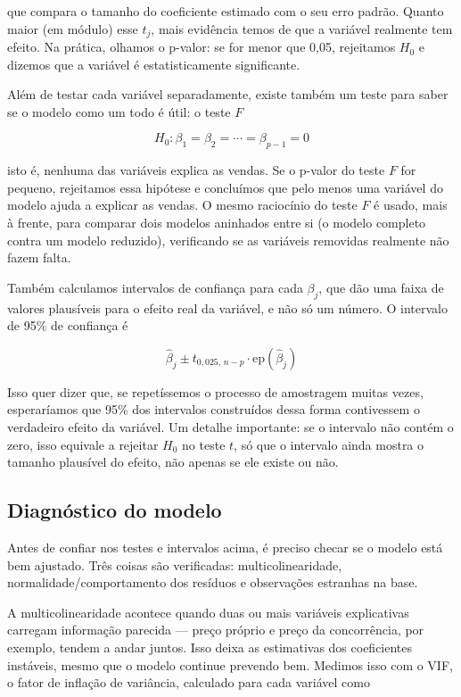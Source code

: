 \documentclass[a4paper]{modeloUFCG} %
\begin{document}
que compara o tamanho do coeficiente estimado com o seu erro padrão. Quanto maior (em módulo) esse \(t_j\), mais evidência temos de que a variável realmente tem efeito. Na prática, olhamos o p-valor: se for menor que 0,05, rejeitamos \(H_0\) e dizemos que a variável é estatisticamente significante.

Além de testar cada variável separadamente, existe também um teste para saber se o modelo como um todo é útil: o teste \(F\)

\[
H_0: \beta_1 = \beta_2 = \cdots = \beta_{p-1} = 0
\]

isto é, nenhuma das variáveis explica as vendas. Se o p-valor do teste \(F\) for pequeno, rejeitamos essa hipótese e concluímos que pelo menos uma variável do modelo ajuda a explicar as vendas. O mesmo raciocínio do teste \(F\) é usado, mais à frente, para comparar dois modelos aninhados entre si (o modelo completo contra um modelo reduzido), verificando se as variáveis removidas realmente não fazem falta.

Também calculamos intervalos de confiança para cada \(\beta_j\), que dão uma faixa de valores plausíveis para o efeito real da variável, e não só um número. O intervalo de 95\% de confiança é

\[
\hat{\beta}_j \pm t_{0{,}025,\, n-p} \cdot \text{ep}(\hat{\beta}_j)
\]

Isso quer dizer que, se repetíssemos o processo de amostragem muitas vezes, esperaríamos que 95\% dos intervalos construídos dessa forma contivessem o verdadeiro efeito da variável. Um detalhe importante: se o intervalo não contém o zero, isso equivale a rejeitar \(H_0\) no teste \(t\), só que o intervalo ainda mostra o tamanho plausível do efeito, não apenas se ele existe ou não.

\subsection{Diagnóstico do modelo}\label{diagnuxf3stico-do-modelo}

Antes de confiar nos testes e intervalos acima, é preciso checar se o modelo está bem ajustado. Três coisas são verificadas: multicolinearidade, normalidade/comportamento dos resíduos e observações estranhas na base.

A multicolinearidade acontece quando duas ou mais variáveis explicativas carregam informação parecida --- preço próprio e preço da concorrência, por exemplo, tendem a andar juntos. Isso deixa as estimativas dos coeficientes instáveis, mesmo que o modelo continue prevendo bem. Medimos isso com o VIF, o fator de inflação de variância, calculado para cada variável como
\end{document}
